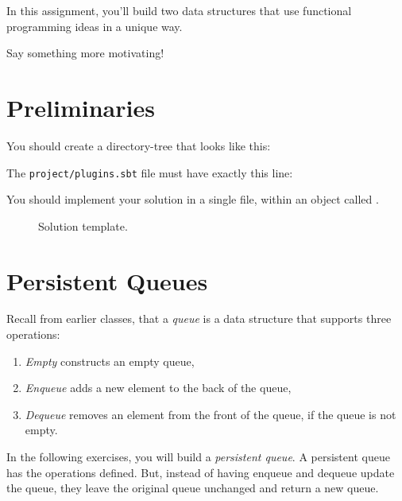 
In this assignment, you'll build two data structures that use functional
programming ideas in a unique way.
\begin{instructor}
Say something more motivating!
\end{instructor}

\section{Preliminaries}

You should create a directory-tree that looks like this:


The \texttt{project/plugins.sbt} file must have exactly this line:


You should implement your solution in a single file, within an object called
.

\begin{figure}
\caption{Solution template.}
\end{figure}

\section{Persistent Queues}

Recall from earlier classes, that a \emph{queue} is a data structure that
supports three operations:

\begin{enumerate}

\item \emph{Empty} constructs an empty queue,

\item \emph{Enqueue} adds a new element to the back of the queue,

\item \emph{Dequeue} removes an element from the front of the queue, if the queue is
  not empty.

\end{enumerate}

In the following exercises, you will build a \emph{persistent queue}. A
persistent queue has the operations defined. But, instead of having enqueue and
dequeue update the queue, they leave the original queue unchanged and return a
new queue.


